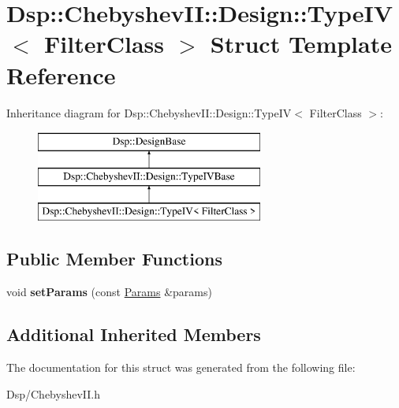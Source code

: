 \hypertarget{structDsp_1_1ChebyshevII_1_1Design_1_1TypeIV}{\section{Dsp\-:\-:Chebyshev\-I\-I\-:\-:Design\-:\-:Type\-I\-V$<$ Filter\-Class $>$ Struct Template Reference}
\label{structDsp_1_1ChebyshevII_1_1Design_1_1TypeIV}
}
Inheritance diagram for Dsp\-:\-:Chebyshev\-I\-I\-:\-:Design\-:\-:Type\-I\-V$<$ Filter\-Class $>$\-:\begin{figure}[H]
\begin{center}
\leavevmode
\includegraphics[height=3.000000cm]{structDsp_1_1ChebyshevII_1_1Design_1_1TypeIV}
\end{center}
\end{figure}
\subsection*{Public Member Functions}
\begin{DoxyCompactItemize}
\item 
\hypertarget{structDsp_1_1ChebyshevII_1_1Design_1_1TypeIV_a0c4a0e7a4965895c942e8f0293ff7028}{void {\bfseries set\-Params} (const \hyperlink{structDsp_1_1Params}{Params} \&params)}\label{structDsp_1_1ChebyshevII_1_1Design_1_1TypeIV_a0c4a0e7a4965895c942e8f0293ff7028}

\end{DoxyCompactItemize}
\subsection*{Additional Inherited Members}


The documentation for this struct was generated from the following file\-:\begin{DoxyCompactItemize}
\item 
Dsp/Chebyshev\-I\-I.\-h\end{DoxyCompactItemize}
